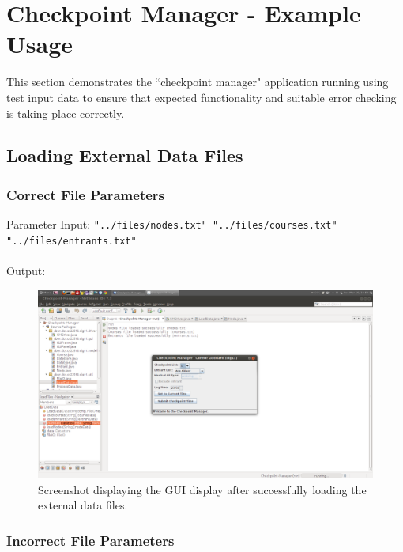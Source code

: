 \documentclass[a4paper, 10pt]{article}
\begin{document}
\clearpage
\section{Checkpoint Manager - Example Usage}
This section demonstrates the ``checkpoint manager" application running using test input data to ensure that expected functionality and suitable error checking is taking place correctly.\\

\subsection{Loading External Data Files}

\subsubsection{Correct File Parameters}

Parameter Input: \verb+"../files/nodes.txt" "../files/courses.txt" "../files/entrants.txt"+ \\\\
Output:


\begin{figure}[ht!]
\centering
\includegraphics[scale=0.3]{cm-loadsuccess.png}
\caption{Screenshot displaying the GUI display after successfully loading the external data files.}
\end{figure}

\clearpage
\subsubsection{Incorrect File Parameters}
\end{document}

